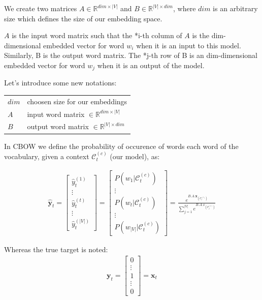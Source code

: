 We create two matrices $A \in \mathbb{R}^{dim \times |V|}$ and $B \in \mathbb{R}^{|V| \times dim}$, where $dim$ is an arbitrary size which defines the size of our embedding space.

$A$ is the input word matrix such that the *i-th column of $A$ is the dim-dimensional embedded vector for word $w_{i}$ when it is an input to this model. 
Similarly, B is the output word matrix. The *j-th row of B is an dim-dimensional embedded vector for word $w_j$ when it is an output of the model. 



Let's introduce some new notations:

{\ttfamily
\begin{table}[H]
    \centering
    \begin{tabular}{ll}
        \toprule
        $dim$ 				& choosen size for our embeddings \\
        $A$ 				& input word matrix $\in \mathbb{R}^{dim \times |V|}$ \\
        $B$ 				& output word matrix $\in \mathbb{R}^{|V| \times dim}$ \\
        \bottomrule
    \end{tabular}
\end{table}
}

In CBOW we define the probability of occurence of words each word of the vocabulary, given a context $\mathcal{C}_t^{(c)}$ (our model), as:

\begin{align}
 \mathbf{\hat y}_t = 
 	\begin{bmatrix} 
		\hat y_t^{(1)} \\
		\vdots \\
		\hat y_t^{(t)}\\
		\vdots \\
		\hat y_t^{(|V|)}
	\end{bmatrix}  
	= 
	\begin{bmatrix} 
		P(w_1 | \mathcal{C}_t^{(c)}) \\
		\vdots \\
		P(w_t | \mathcal{C}_t^{(c)})\\
		\vdots \\
		P(w_{|V|} | \mathcal{C}_t^{(c)})
	\end{bmatrix} = 
	\frac{e^{B.A.\mathbf{x}_{(\mathcal{C}_t^{(c)})}}}
	{\sum_{j=1}^{|V|} e^{B.A.x_{(\mathcal{C}_j^{(c)})}}}
\end{align}

Whereas the true target is noted:
\begin{align}
 \mathbf{y}_t = 
	\begin{bmatrix} 
		0 \\
		\vdots \\
		1 \\
		\vdots \\
		0
	\end{bmatrix} 
	= \mathbf{x}_t
\end{align}


